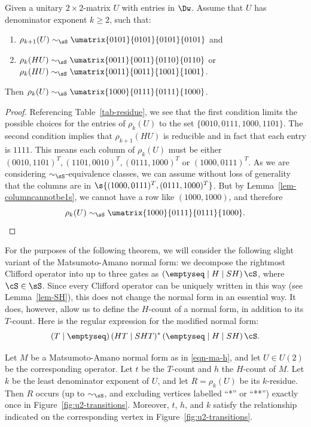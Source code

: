 \documentclass{article}
\begin{document}
\begin{lemma}\label{lem-reduction}
  Given a unitary $2\times 2$-matrix $U$ with entries in $\Dw$. Assume
  that $U$ has denominator exponent $k\ge2$, such that:
  \begin{enumerate}
    \item $\rho_{k+1}(U) \sim_{\sS} \umatrix{0101}{0101}{0101}{0101}$ and
    \item $\rho_k(H U) \sim_{\sS} \umatrix{0011}{0011}{0110}{0110}$ or
      $\rho_k(H U) \sim_{\sS} \umatrix{0011}{0011}{1001}{1001}$.
  \end{enumerate}
  Then $\rho_k(U) \sim_{\sS} \umatrix{1000}{0111}{0111}{1000}$.
\end{lemma}

\begin{proof}
  Referencing Table~\ref{tab-residue}, we see that the first condition
  limits the possible choices for the entries of $\rho_k(U)$ to the
  set $\{0010, 0111, 1000, 1101\}$. The second condition implies that
  $\rho_{k+1}(H U)$ is reducible and in fact that each entry is
  $1111$.  This means each column of $\rho_k(U)$ must be either
  $(0010, 1101)^T, (1101, 0010)^T, (0111,1000)^T$ or
  $(1000,0111)^T$. As we are considering $\sim_{\sS}$-equivalence
  classes, we can assume without loss of generality that the columns
  are in $\s{(1000, 0111)^T, (0111, 1000)^T}$.  But by
  Lemma~\ref{lem-columncannotbe1s}, we cannot have a row like $(1000,
  1000)$, and therefore
  \[ \rho_k(U) \sim_{\sS} \umatrix{1000}{0111}{0111}{1000}.\qedhere
  \]
\end{proof}

\begin{convention}
  For the purposes of the following theorem, we will consider the
  following slight variant of the Matsumoto-Amano normal form: we
  decompose the rightmost Clifford operator into up to three gates as
  $(\emptyseq\mid H\mid SH)\,\cS$, where $\cS\in\sS$. Since every
  Clifford operator can be uniquely written in this way (see
  Lemma~\ref{lem-SH}), this does not change the normal form in an
  essential way. It does, however, allow us to define the $H$-count of
  a normal form, in addition to its $T$-count. Here is the regular
  expression for the modified normal form:
  \begin{equation}\label{eqn-ma-h}
    (T\mid\emptyseq)\,(HT\mid SHT)^*\,(\emptyseq\mid H\mid SH)\,\cS.
  \end{equation}
\end{convention}


\begin{theorem}
  Let $M$ be a Matsumoto-Amano normal form as in {\eqref{eqn-ma-h}},
  and let $U\in U(2)$ be the corresponding operator. Let $t$ be the
  $T$-count and $h$ the $H$-count of $M$. Let $k$ be the least
  denominator exponent of $U$, and let $R=\rho_k(U)$ be its
  $k$-residue. Then $R$ occurs (up to $\sim_{\sS}$, and excluding
  vertices labelled ``*'' or ``**'') exactly once in
  Figure~\ref{fig:u2-transitions}. Moreover, $t$, $h$, and $k$ satisfy
  the relationship indicated on the corresponding vertex in
  Figure~\ref{fig:u2-transitions}.
\end{theorem}
\end{document}
